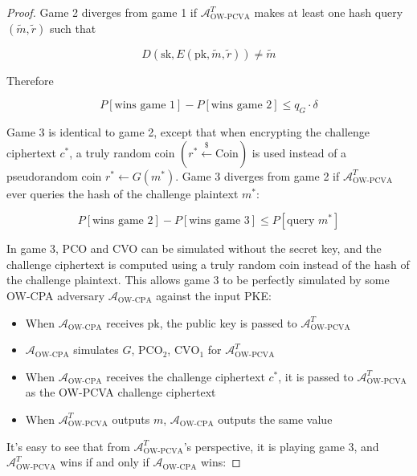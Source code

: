 \documentclass{article}
\newcommand{\leftsample}{\overset{{\scriptscriptstyle\$}}{\leftarrow}}
\begin{document}
\begin{proof}
    Game 2 diverges from game 1 if $\mathcal{A}^T_\text{OW-PCVA}$ makes at least one hash query $(\tilde{m}, \tilde{r})$ such that 
    
    $$D(\text{sk}, E(\text{pk}, \tilde{m}, \tilde{r})) \neq \tilde{m}$$

    Therefore 

    \begin{equation}\label{ow-pcva-g1-g2}
        P[\text{wins game 1}] - P[\text{wins game 2}] \leq q_G \cdot \delta  
    \end{equation}

    Game 3 is identical to game 2, except that when encrypting the challenge ciphertext $c^\ast$, a truly random coin $(r^\ast \leftsample \text{Coin})$ is used instead of a pseudorandom coin $r^\ast \leftarrow G(m^\ast)$. Game 3 diverges from game 2 if $\mathcal{A}^T_\text{OW-PCVA}$ ever queries the hash of the challenge plaintext $m^\ast$:

    \begin{equation}\label{ow-pcva-g2-g3}
        P[\text{wins game 2}] - P[\text{wins game 3}] \leq P[\text{query $m^\ast$}]
    \end{equation}

    In game 3, PCO and CVO can be simulated without the secret key, and the challenge ciphertext is computed using a truly random coin instead of the hash of the challenge plaintext. This allows game 3 to be perfectly simulated by some OW-CPA adversary $\mathcal{A}_\text{OW-CPA}$ against the input PKE:

    \begin{itemize}
        \item When $\mathcal{A}_\text{OW-CPA}$ receives $\text{pk}$, the public key is passed to $\mathcal{A}^T_\text{OW-PCVA}$
        \item $\mathcal{A}_\text{OW-CPA}$ simulates $G$, $\text{PCO}_2$, $\text{CVO}_1$ for $\mathcal{A}^T_\text{OW-PCVA}$
        \item When $\mathcal{A}_\text{OW-CPA}$ receives the challenge ciphertext $c^\ast$, it is passed to $\mathcal{A}^T_\text{OW-PCVA}$ as the OW-PCVA challenge ciphertext
        \item When $\mathcal{A}^T_\text{OW-PCVA}$ outputs $m$, $\mathcal{A}_\text{OW-CPA}$ outputs the same value
    \end{itemize}

    It's easy to see that from $\mathcal{A}^T_\text{OW-PCVA}$'s perspective, it is playing game 3, and $\mathcal{A}^T_\text{OW-PCVA}$ wins if and only if $\mathcal{A}_\text{OW-CPA}$ wins:


\end{proof}
\end{document}
